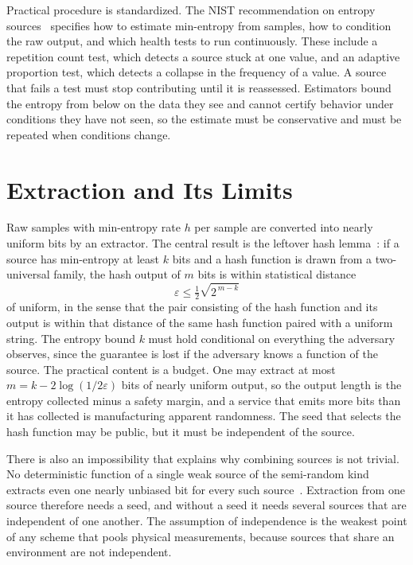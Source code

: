 Practical procedure is standardized. The NIST recommendation on entropy sources~\cite{turan2018} specifies how to estimate min-entropy from samples, how to condition the raw output, and which health tests to run continuously. These include a repetition count test, which detects a source stuck at one value, and an adaptive proportion test, which detects a collapse in the frequency of a value. A source that fails a test must stop contributing until it is reassessed. Estimators bound the entropy from below on the data they see and cannot certify behavior under conditions they have not seen, so the estimate must be conservative and must be repeated when conditions change.

\section{Extraction and Its Limits}

Raw samples with min-entropy rate $h$ per sample are converted into nearly uniform bits by an extractor. The central result is the leftover hash lemma~\cite{hill1999}: if a source has min-entropy at least $k$ bits and a hash function is drawn from a two-universal family, the hash output of $m$ bits is within statistical distance
\[
\varepsilon\le\tfrac12\sqrt{2^{\,m-k}}
\]
of uniform, in the sense that the pair consisting of the hash function and its output is within that distance of the same hash function paired with a uniform string. The entropy bound $k$ must hold conditional on everything the adversary observes, since the guarantee is lost if the adversary knows a function of the source. The practical content is a budget. One may extract at most $m=k-2\log(1/2\varepsilon)$ bits of nearly uniform output, so the output length is the entropy collected minus a safety margin, and a service that emits more bits than it has collected is manufacturing apparent randomness. The seed that selects the hash function may be public, but it must be independent of the source.

There is also an impossibility that explains why combining sources is not trivial. No deterministic function of a single weak source of the semi-random kind extracts even one nearly unbiased bit for every such source~\cite{santha1986}. Extraction from one source therefore needs a seed, and without a seed it needs several sources that are independent of one another. The assumption of independence is the weakest point of any scheme that pools physical measurements, because sources that share an environment are not independent.

